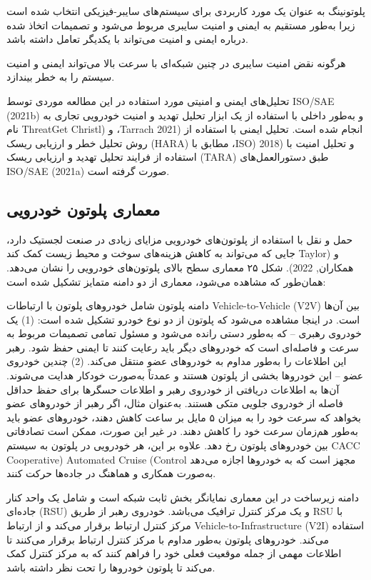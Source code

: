 \documentclass[a4paper,10pt]{article}
\begin{document}
        پلوتونینگ به عنوان یک مورد کاربردی برای سیستم‌های سایبر-فیزیکی انتخاب شده است زیرا به‌طور مستقیم به ایمنی و امنیت سایبری مربوط می‌شود و تصمیمات اتخاذ شده درباره ایمنی و امنیت می‌تواند با یکدیگر تعامل داشته باشد.
    
        هرگونه نقض امنیت سایبری در چنین شبکه‌ای با سرعت بالا می‌تواند ایمنی و امنیت سیستم را به خطر بیندازد.
    
        تحلیل‌های ایمنی و امنیتی مورد استفاده در این مطالعه موردی توسط ISO/SAE (2021b) و به‌طور داخلی با استفاده از یک ابزار تحلیل تهدید و امنیت خودرویی تجاری به نام ThreatGet Christl) و ،Tarrach 2021) انجام شده است. تحلیل ایمنی با استفاده از روش تحلیل خطر و ارزیابی ریسک (HARA) مطابق با ،ISO) 2018) و تحلیل امنیت با استفاده از فرایند تحلیل تهدید و ارزیابی ریسک (TARA) طبق دستورالعمل‌های ISO/SAE (2021a) صورت گرفته است.

        \subsection{معماری پلوتون خودرویی}

            حمل و نقل با استفاده از پلوتون‌های خودرویی مزایای زیادی در صنعت لجستیک دارد، جایی که می‌تواند به کاهش هزینه‌های سوخت و محیط زیست کمک کند Taylor) و همکاران, 2022). شکل ۲۵ معماری سطح بالای پلوتون‌های خودرویی را نشان می‌دهد. همان‌طور که مشاهده می‌شود، معماری از دو دامنه متمایز تشکیل شده است:

            دامنه پلوتون شامل خودروهای پلوتون با ارتباطات Vehicle-to-Vehicle (V2V) بین آن‌ها است. در اینجا مشاهده می‌شود که پلوتون از دو نوع خودرو تشکیل شده است: (1) یک خودروی رهبری – که به‌طور دستی رانده می‌شود و مسئول تمامی تصمیمات مربوط به سرعت و فاصله‌ای است که خودروهای دیگر باید رعایت کنند تا ایمنی حفظ شود. رهبر این اطلاعات را به‌طور مداوم به خودروهای عضو منتقل می‌کند. (2) چندین خودروی عضو – این خودروها بخشی از پلوتون هستند و عمدتاً به‌صورت خودکار هدایت می‌شوند. آن‌ها به اطلاعات دریافتی از خودروی رهبر و اطلاعات حسگرها برای حفظ حداقل فاصله از خودروی جلویی متکی هستند. به‌عنوان مثال، اگر رهبر از خودروهای عضو بخواهد که سرعت خود را به میزان ۵ مایل بر ساعت کاهش دهند، خودروهای عضو باید به‌طور هم‌زمان سرعت خود را کاهش دهند. در غیر این صورت، ممکن است تصادفاتی بین خودروهای پلوتون رخ دهد. علاوه بر این، هر خودرویی در پلوتون به سیستم CACC Cooperative) Automated Cruise (Control مجهز است که به خودروها اجازه می‌دهد به‌صورت همکاری و هماهنگ در جاده‌ها حرکت کنند.
        
            دامنه زیرساخت در این معماری نمایانگر بخش ثابت شبکه است و شامل یک واحد کنار جاده‌ای (RSU) و یک مرکز کنترل ترافیک می‌باشد. خودروی رهبر از طریق RSU با مرکز کنترل ارتباط برقرار می‌کند و از ارتباط Vehicle-to-Infrastructure (V2I) استفاده می‌کند. خودروهای پلوتون به‌طور مداوم با مرکز کنترل ارتباط برقرار می‌کنند تا اطلاعات مهمی از جمله موقعیت فعلی خود را فراهم کنند که به مرکز کنترل کمک می‌کند تا پلوتون خودروها را تحت نظر داشته باشد.
\end{document}

